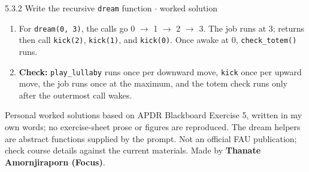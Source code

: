 \documentclass[11pt]{article}
\begin{document}
\begin{keepsection}
\begin{workedbox}{5.3.2 Write the recursive \texttt{dream} function \ensuremath{\cdot} worked solution}
\begin{enumerate}
\begin{tcolorbox}[colback=Paperblue,colframe=Paperblue,boxrule=0pt,arc=0pt,left=7pt,right=7pt,top=5pt,bottom=5pt]
\noindent\hspace*{1em}\texttt{else:}\par
\noindent\hspace*{3em}\texttt{next\_level = current\_level + 1}\par
\noindent\hspace*{3em}\texttt{play\_lullaby(next\_level)}\par
\noindent\hspace*{3em}\texttt{dream(next\_level, max\_level)}\par
\noindent\hspace*{3em}\texttt{kick(current\_level)}\par
\noindent\hspace*{0em}\texttt{}\par
\noindent\hspace*{1em}\texttt{if current\_level == 0:}\par
\noindent\hspace*{3em}\texttt{return check\_totem()}\par
\end{tcolorbox}
\item For \texttt{dream(0, 3)}, the calls go 0 \ensuremath{\to} 1 \ensuremath{\to} 2 \ensuremath{\to} 3. The job runs at 3; returns then call \texttt{kick(2)}, \texttt{kick(1)}, and \texttt{kick(0)}. Once awake at 0, \texttt{check\_totem()} runs.
\item \textbf{Check:} \texttt{play\_lullaby} runs once per downward move, \texttt{kick} once per upward move, the job runs once at the maximum, and the totem check runs only after the outermost call wakes.
\end{enumerate}
\end{workedbox}

\end{keepsection}

\vfill{\small Personal worked solutions based on APDR Blackboard Exercise 5, written in my own words; no exercise-sheet prose or figures are reproduced. The dream helpers are abstract functions supplied by the prompt. Not an official FAU publication; check course details against the current materials. Made by \textbf{Thanate Amornjiraporn (Focus)}.}
\end{document}
